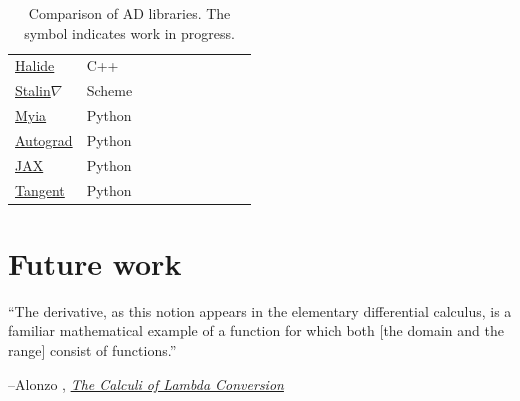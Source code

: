\documentclass[12pt,initial,twoside,maitrise]{dms}
\newcommand{\wmark}{\textcolor{orange}{\ding{45}}}
\newcommand{\cmark}{\textcolor{green!80!black}{\ding{51}}}
\newcommand{\xmark}{\textcolor{red}{\ding{55}}}
\numberwithin{equation}{section}
\numberwithin{table}{chapter}
\numberwithin{figure}{chapter}
\begin{document}
\begin{table}
\begin{tabular}{llllllllll}
\href{https://halide-lang.org}{Halide}                                           & C++     & \xmark & \cmark & \cmark & \xmark & \cmark & \xmark & \xmark & \xmark \\
\href{https://github.com/Functional-AutoDiff/STALINGRAD}{Stalin$\nabla$}         & Scheme  & \xmark & \cmark & \xmark & \xmark & \xmark & \xmark & \xmark & \xmark \\
\href{https://github.com/mila-iqia/myia}{Myia}                                   & Python  & \cmark & \cmark & \cmark & \cmark & \xmark & \xmark & \xmark & \wmark \\
\href{https://github.com/HIPS/autograd/}{Autograd}                               & Python  & \xmark & \cmark & \xmark & \xmark & \xmark & \xmark & \xmark & \xmark \\
\href{https://github.com/google/jax}{JAX}                                        & Python  & \xmark & \cmark & \cmark & \cmark & \xmark & \xmark & \xmark & \wmark \\
\href{https://github.com/google/tangent}{Tangent}                                & Python  & \xmark & \cmark & \xmark & \xmark & \xmark & \xmark & \xmark & \xmark \\

\end{tabular}
\caption{\label{tab:ad_comparison} Comparison of AD libraries. The \wmark symbol indicates work in progress.}
\end{table}

\vspace{-20pt}\section{Future work}\label{sec:future-work}


\vspace{2pt}\setlength{\epigraphwidth}{0.65\textwidth}
\epigraph{``The derivative, as this notion appears in the elementary differential calculus, is a familiar mathematical example of a function for which both [the domain and the range] consist of functions.''}{\begin{flushright}--Alonzo \citet{church1941calculi}, \href{https://archive.org/details/AnnalsOfMathematicalStudies6ChurchAlonzoTheCalculiOfLambdaConversionPrincetonUniversityPress1941}{\textit{The Calculi of Lambda Conversion}}\end{flushright}}
\end{document}
